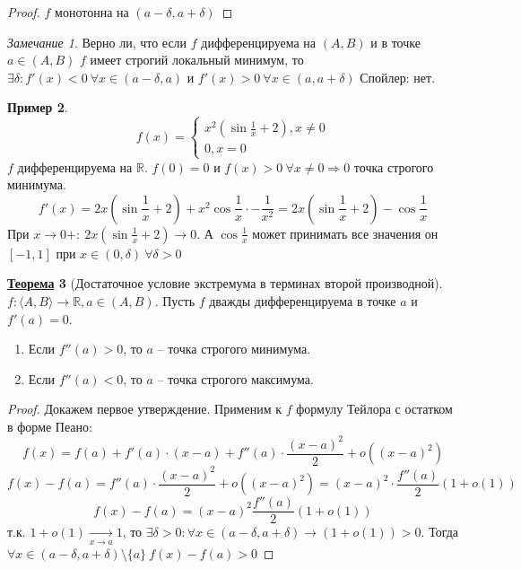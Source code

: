 \documentclass[12pt]{article}
\newenvironment{MyList}[1][4pt]{
  \begin{enumerate}[1.]
  \setlength{\parskip}{0pt}
  \setlength{\itemsep}{#1}
}{       
  \end{enumerate}
}
\def\R{\mathbb{R}}       %
\def\SO{\Rightarrow}     %
\theoremstyle{definition} %
\newtheorem{Thm}{\underline{Теорема}}[subsection] %
\newtheorem{Example}[Thm]{Пример} %
\theoremstyle{plain} %
\theoremstyle{remark} %
\newtheorem{Rem}[Thm]{Замечание} %
\begin{document}
\begin{proof}
    $f$ монотонна на $(a - \delta, a + \delta)$ 
\end{proof}

\begin{Rem}
    Верно ли, что если $f$ дифференцируема на $(A, B)$ и в точке $a \in (A, B)$ $f$ имеет строгий локальный минимум, то $\exists \delta : f'(x) < 0 \ \forall x \in (a - \delta, a)$ и $f'(x) > 0 \ \forall x \in (a, a + \delta)$  
    Спойлер: нет.
\end{Rem}

\begin{Example}
    \[f(x) = \begin{cases}
        x^2 \left(\sin\frac{1}{x} + 2\right), x \neq 0 \\
        0, x = 0
    \end{cases}\]
    $f$ дифференцируема на $\R$. $f(0) = 0$ и $f(x) > 0 \ \forall x \neq 0 \SO 0$ точка строгого минимума.
    \[f'(x) = 2x\left(\sin \frac{1}{x} + 2\right) + x^2 \cos \frac{1}{x} \cdot -\frac{1}{x^2} = 2x\left(\sin \frac{1}{x} + 2\right) - \cos \frac{1}{x}\]
    При $x \to 0+ : \ 2x \left(\sin \frac{1}{x} + 2\right) \to 0$. А $\cos \frac{1}{x}$ может принимать все значения он $[-1, 1]$ при $x \in (0, \delta) \ \forall \delta > 0$ 
\end{Example}

\begin{Thm}[Достаточное условие экстремума в терминах второй производной]
    $f : \langle A, B\rangle \to \R, a \in (A, B)$. Пусть $f$ дважды дифференцируема в точке $a$ и $f'(a) = 0$.
    \begin{MyList}
        \item Если $f''(a) > 0$, то $a$ -- точка строгого минимума.
        \item Если $f''(a) < 0$, то $a$ -- точка строгого максимума. 
    \end{MyList}
\end{Thm}

\begin{proof}
    Докажем первое утверждение. Применим к $f$ формулу Тейлора с остатком в форме Пеано:
    \[f(x) = f(a) + f'(a) \cdot (x - a) + f''(a) \cdot \frac{(x - a)^2}{2} + o((x - a)^2)\]
    \[f(x) - f(a) = f''(a) \cdot \frac{(x - a)^2}{2} + o((x - a)^2) = (x-a)^2 \cdot \frac{f''(a)}{2}(1 + o(1))\]
    \[f(x) - f(a) = (x - a)^2 \frac{f''(a)}{2}(1 + o(1))\]
    т.к. $1 + o(1) \xrightarrow[x \to a]{} 1$, то $\exists \delta > 0 : \forall x \in (a - \delta, a + \delta) \to (1 + o(1)) > 0$.
    Тогда $\forall x \in (a - \delta, a + \delta) \setminus \{a\} \ f(x) - f(a) > 0$  
\end{proof}
\end{document}
